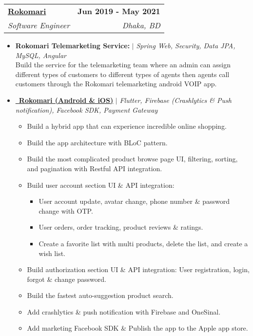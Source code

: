 \documentclass[letterpaper,11pt]{article}
\makeatletter
\newcommand{\resumeItem}[1]{
  \item\small{
    {#1 \vspace{-2pt}}
  }
}
\newcommand{\resumeSubheading}[4]{
  \vspace{-2pt}\item
    \begin{tabular*}{1.0\textwidth}[t]{l@{\extracolsep{\fill}}r}
      \textbf{#1} & \textbf{\small #2} \\
      \textit{\small#3} & \textit{\small #4} \\
    \end{tabular*}\vspace{-7pt}
}
\newcommand{\resumeItemListStart}{\begin{itemize}}
\newcommand{\resumeItemListEnd}{\end{itemize}\vspace{-5pt}}
\makeatother
\begin{document}
    \resumeSubheading
      {\href{http://rokomari.com/}{Rokomari}}{Jun 2019 - May 2021}
      {Software Engineer}{Dhaka, BD}
      \resumeItemListStart
        \resumeItem{\textbf {Rokomari Telemarketing Service:} $|$ \emph{Spring Web, Security, Data JPA, MySQL, Angular}}\\
          {Build the service for the telemarketing team where an admin can assign different types of customers to different types of agents then agents call customers through the Rokomari telemarketing android VOIP app.}

        \resumeItem
        {\href{https://apps.apple.com/us/app/rokomari-trusted-online-store/id1493045502}{\raisebox{-0.2\height}\ \underline{\textbf{Rokomari (Android \& iOS)}}} $|$ \emph{Flutter, Firebase (Crashlytics \& Push notification), Facebook SDK, Payment Gateway}}\\
          {
            \begin{itemize}
            \item Build a hybrid app that can experience incredible online shopping.
            \item Build the app architecture with BLoC pattern.
            \item Build the most complicated product browse page UI, filtering, sorting, and pagination with Restful API
            integration.
            \item Build user account section UI \& API integration:
            \begin{itemize}
            \item User account update, avatar change, phone number \& password change with OTP.
            \item User orders, order tracking, product reviews \& ratings.
            \item Create a favorite list with multi products, delete the list, and create a wish list.
            \end{itemize}
            \item Build authorization section UI \& API integration: User registration, login, forgot \& change password.
            \item Build the fastest auto-suggestion product search.
            \item Add crashlytics \& push notification with Firebase and OneSinal.
            \item Add marketing Facebook SDK \& Publish the app to the Apple app store.
            \end{itemize}
        }
      \resumeItemListEnd
\end{document}
